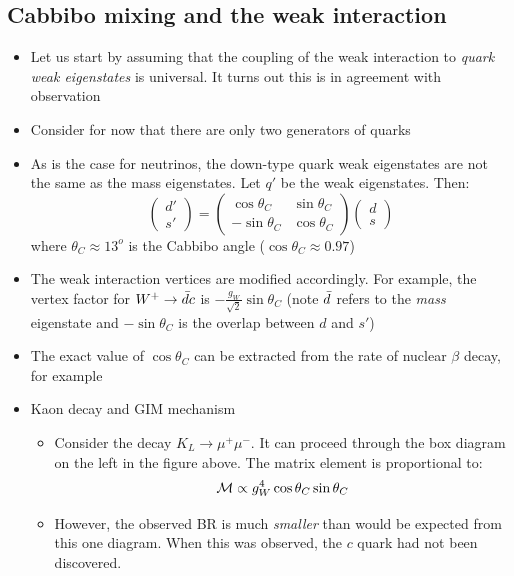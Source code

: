 \subsection{Cabbibo mixing and the weak interaction}
\begin{itemize}
  \item Let us start by assuming that the coupling of the weak interaction to \emph{quark weak eigenstates} is universal. It turns out this is in agreement with observation
  \item Consider for now that there are only two generators of quarks
  \item As is the case for neutrinos, the down-type quark weak eigenstates are not the same as the mass eigenstates. Let $q'$ be the weak eigenstates. Then:
  \begin{equation}
    \begin{pmatrix} d' \\ s' \end{pmatrix}
     = \begin{pmatrix} \cos\theta_C & \sin\theta_C \\ -\sin\theta_C & \cos\theta_C \end{pmatrix}
    \begin{pmatrix} d \\ s \end{pmatrix}
  \end{equation}
  where $\theta_C\approx 13^o$ is the Cabbibo angle ($\cos\theta_C \approx 0.97$)
  \item The weak interaction vertices are modified accordingly. For example, the vertex factor for $W^+\rightarrow \bar{d} c$ is $-\frac{g_W}{\sqrt2}\sin\theta_C$ (note $\bar{d}$ refers to the \emph{mass} eigenstate and $-\sin\theta_C$ is the overlap between $d$ and $s'$)
  \item The exact value of $\cos\theta_C$ can be extracted from the rate of nuclear $\beta$ decay, for example
  \item Kaon decay and GIM mechanism
  \begin{itemize}
    \item Consider the decay $K_L \rightarrow \mu^+\mu^-$. It can proceed through the box diagram on the left in the figure above. The matrix element is proportional to:
    \begin{equation}
      \mathcal{M} \propto g_W^4\cos\theta_C\sin\theta_C
    \end{equation}
    \item However, the observed BR is much \emph{smaller} than would be expected from this one diagram. When this was observed, the $c$ quark had not been discovered.

\end{itemize}
\end{itemize}
